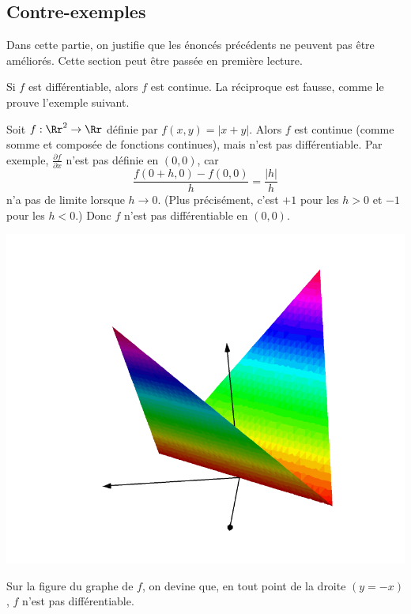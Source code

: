 \subsection{Contre-exemples}


Dans cette partie, on justifie que les énoncés précédents ne peuvent pas être améliorés. Cette section peut être passée en première lecture.


\bigskip


Si $f$ est différentiable, alors $f$ est continue. La réciproque est fausse, comme le prouve l'exemple suivant.

\begin{exemple}{}{}
	Soit $f : \Rr^2 \to \Rr$ définie par $f(x,y) = |x+y|$.
	Alors $f$ est continue (comme somme et composée de fonctions continues), mais n'est pas différentiable. Par exemple, $\frac{\partial f}{\partial x}$ n'est pas définie en $(0,0)$, car 
	$$\frac{f(0+h,0)-f(0,0)}{h} = \frac{|h|}{h}$$
	n'a pas de limite lorsque $h \to 0$. (Plus précisément, c'est $+1$ pour les $h>0$ et $-1$ pour les $h<0$.) Donc $f$ n'est pas différentiable en $(0,0)$.
	
	
	\begin{center}
		\includegraphics[scale=0.3]{figures/fig-calculdiff-03}
	\end{center}
	
	
	Sur la figure du graphe de $f$, on devine que, en tout point de la droite $(y=-x)$, $f$ n'est pas différentiable.
\end{exemple}


